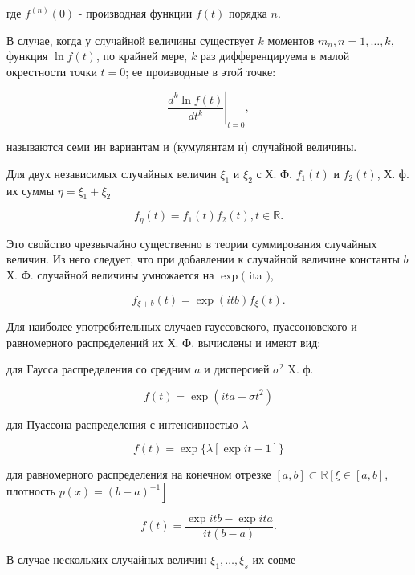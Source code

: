 \documentclass[10pt]{article}
\begin{document}
где $f^{(n)}(0)$ - производная функции $f(t)$ порядка $n$.



В случае, когда у случайной величины существует $k$ моментов $m_{n}, n=1, \ldots, k$, функция $\ln f(t)$, по крайней мере, $k$ раз дифференцируема в малой окрестности точки $t=0$; ее производные в этой точке:



\[

\left.\frac{d^{k} \ln f(t)}{d t^{k}}\right|_{t=0},

\]



называются семи ин вариантам и (кумулянтам и) случайной величины.



Для двух независимых случайных величин $\xi_{1}$ и $\xi_{2}$ с Х. Ф. $f_{1}(t)$ и $f_{2}(t)$, Х. ф. их суммы $\eta=\xi_{1}+\xi_{2}$



\[

f_{\eta}(t)=f_{1}(t) f_{2}(t), t \in \mathbb{R} .

\]



Это свойство чрезвычайно существенно в теории суммирования случайных величин. Из него следует, что при добавлении к случайной величине константы $b$ Х. Ф. случайной величины умножается на $\exp ($ ita $)$,



\[

f_{\xi+b}(t)=\exp (i t b) f_{\xi}(t) .

\]



Для наиболее употребительных случаев гауссовского, пуассоновского и равномерного распределений их Х. Ф. вычислены и имеют вид:



для Гаусса распределения со средним $a$ и дисперсией $\sigma^{2}$ X. ф.



\[

f(t)=\exp \left(i t a-\sigma t^{2}\right)

\]



для Пуассона распределения с интенсивностью $\lambda$



\[

f(t)=\exp \{\lambda[\exp i t-1]\}

\]



для равномерного распределения на конечном отрезке $[a, b] \subset \mathbb{R}\left[\xi \in[a, b]\right.$, плотность $\left.p(x)=(b-a)^{-1}\right]$



\[

f(t)=\frac{\exp i t b-\exp i t a}{i t(b-a)} .

\]



В случае нескольких случайных величин $\xi_{1}, \ldots, \xi_{s}$ их совме-
\end{document}
